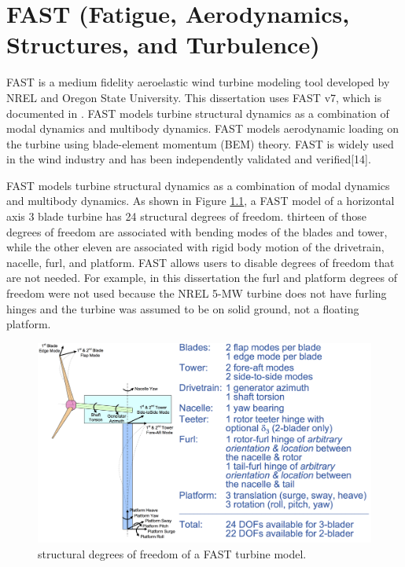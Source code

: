 
\chapter{FAST (Fatigue, Aerodynamics, Structures, and Turbulence) } %

\label{AppendixA} %


FAST is a medium fidelity aeroelastic wind turbine modeling tool developed by NREL and Oregon State University. This dissertation uses FAST v7, which is documented in \cite{jonkman2005,jonkman2013a,jonkman2013}. FAST models turbine structural dynamics as a combination of modal dynamics and multibody dynamics. FAST models aerodynamic loading on the turbine using blade-element momentum (BEM) theory. FAST is widely used in the wind industry and has been independently validated and verified[14].

FAST models turbine structural dynamics as a combination of modal dynamics and multibody dynamics. As shown in Figure \ref{figA-1}, a FAST model of a horizontal axis 3 blade turbine has 24 structural degrees of freedom. thirteen of those degrees of freedom are associated with bending modes of the blades and tower, while the other eleven are associated with rigid body motion of the drivetrain, nacelle, furl, and platform. FAST allows users to disable degrees of freedom that are not needed. For example, in this dissertation the furl and platform degrees of freedom were not used because the NREL 5-MW turbine does not have furling hinges and the turbine was assumed to be on solid ground, not a floating platform. 

\begin{figure}[ht]
	\centering
		\includegraphics[width=\linewidth]{Figures/AppendixAFigures/figA-1.png}
	\caption{structural degrees of freedom of a FAST turbine model.\cite{jonkman2013}}
	\label{figA-1}
\end{figure}


